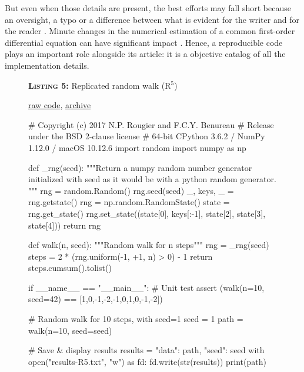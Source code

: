 \documentclass[a4paper,11pt]{article}
\begin{document}
But even when those details are present, the best efforts may fall short because an oversight, a typo or a difference between what is evident for the writer and for the reader \citep{Mesnard:2016}. Minute changes in the numerical estimation of a common first-order differential equation can have significant impact \citep{Crook:2013}. Hence, a reproducible code plays an important role alongside its article: it is a objective catalog of all the implementation details.\\

\begin{figure}[b!]
\noindent \begin{minipage}[c]{\linewidth}
\begin{code}{\parbox{.8\textwidth}{\textbf{\textsc{Listing 5:}} Replicated random walk (R$^5$)}\parbox{.161\textwidth}{\hfill \href{https://raw.githubusercontent.com/rougier/random-walk/frontiers/random-walk-R5.py}{raw code}, \href{https://doi.org/10.5281/zenodo.848217}{archive}}}
# Copyright (c) 2017 N.P. Rougier and F.C.Y. Benureau
# Release under the BSD 2-clause license
# 64-bit CPython 3.6.2 / NumPy 1.12.0 / macOS 10.12.6
import random
import numpy as np

def _rng(seed):
    """Return a numpy random number generator
       initialized with seed as it would be with
       a python random generator.
    """
    rng = random.Random()
    rng.seed(seed)
    _, keys, _ = rng.getstate()
    rng = np.random.RandomState()
    state = rng.get_state()
    rng.set_state((state[0], keys[:-1], state[2],
		           state[3], state[4]))
    return rng

def walk(n, seed):
    """Random walk for n steps"""
    rng = _rng(seed)
    steps = 2 * (rng.uniform(-1, +1, n) > 0) - 1
    return steps.cumsum().tolist()

if __name__ == "__main__":
    # Unit test
    assert (walk(n=10, seed=42) ==
            [1,0,-1,-2,-1,0,1,0,-1,-2])

    # Random walk for 10 steps, with seed=1
    seed = 1
    path = walk(n=10, seed=seed)

    # Save & display results
    results = {"data": path, "seed": seed}
    with open("results-R5.txt", "w") as fd:
        fd.write(str(results))
    print(path)
\end{code}
\end{minipage}
\end{figure}
\end{document}
